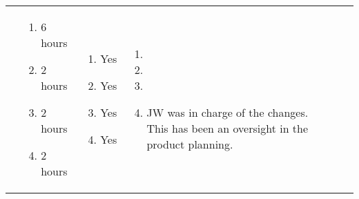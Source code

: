\documentclass[11pt,a4paper,landscape]{article}
\begin{document}
\begin{table}[h]
\begin{tabular}{|p{3cm}|p{5.0cm}|p{3.0cm}|p{2.2cm}|p{2.2cm}|p{2.0cm}|p{5cm}}
&
\begin{enumerate}
\item 6 hours
\item 2 hours
\item 2 hours
\item 2 hours
\end{enumerate}
&
\begin{enumerate}
\item Yes
\item Yes
\item Yes
\item Yes
\end{enumerate}
&
\begin{enumerate}
\item 
\item 
\item 
\item JW was in charge of the changes. This has been an oversight in the product planning.
\end{enumerate}
\\
\end{tabular}
\end{table}
\end{document}
